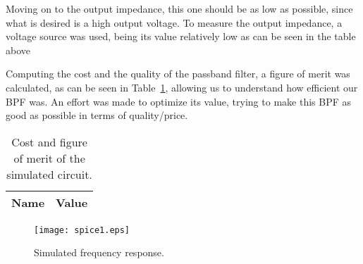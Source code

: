 Moving on to the output impedance, this one should be as low as possible, since what is desired is a high output voltage.  To measure the output impedance, a voltage source was used, being its value relatively low as can be seen in the table above 

Computing the cost and the quality of the passband filter, a figure of merit was calculated, as can be seen in Table~\ref{tab:spice3}, allowing us to understand how efficient our BPF was. An effort was made to optimize its value, trying to make this BPF as good as possible in terms of quality/price.

\begin{table}[H]
    \centering
    \begin{tabular}{|l|r|}
    \hline
    {\bf Name} & {\bf Value} \\ \hline
   
    \end{tabular}
    \caption{Cost and figure of merit of the simulated circuit.}
    \label{tab:spice3}
\end{table}

\begin{figure}[H] \centering
    \texttt{[image: spice1.eps]}
    \caption{Simulated frequency response.}
    \label{fig:sim1}
\end{figure}
